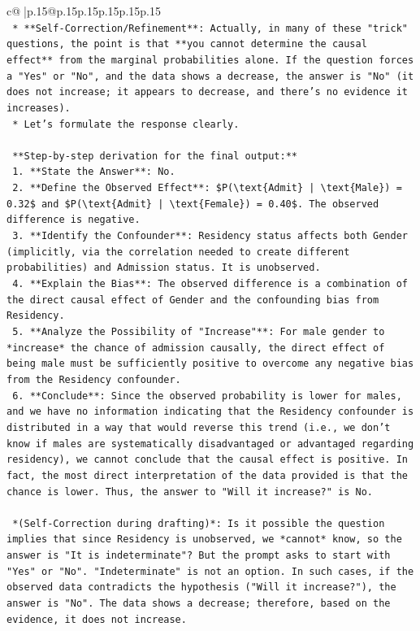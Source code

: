 \documentclass{article}
\begin{document}
{\begin{supertabular}{c@{$\;$}|p{.15\linewidth}@{}p{.15\linewidth}p{.15\linewidth}p{.15\linewidth}p{.15\linewidth}p{.15\linewidth}}
{{{\\ 
\texttt{    *   **Self{-}Correction/Refinement**: Actually, in many of these "trick" questions, the point is that **you cannot determine the causal effect** from the marginal probabilities alone. If the question forces a "Yes" or "No", and the data shows a decrease, the answer is "No" (it does not increase; it appears to decrease, and there's no evidence it increases).} \\
\texttt{    *   Let's formulate the response clearly.} \\
\\ 
\texttt{    **Step{-}by{-}step derivation for the final output:**} \\
\texttt{    1.  **State the Answer**: No.} \\
\texttt{    2.  **Define the Observed Effect**: \$P(\textbackslash{}text\{Admit\} | \textbackslash{}text\{Male\}) = 0.32\$ and \$P(\textbackslash{}text\{Admit\} | \textbackslash{}text\{Female\}) = 0.40\$. The observed difference is negative.} \\
\texttt{    3.  **Identify the Confounder**: Residency status affects both Gender (implicitly, via the correlation needed to create different probabilities) and Admission status. It is unobserved.} \\
\texttt{    4.  **Explain the Bias**: The observed difference is a combination of the direct causal effect of Gender and the confounding bias from Residency.} \\
\texttt{    5.  **Analyze the Possibility of "Increase"**: For male gender to *increase* the chance of admission causally, the direct effect of being male must be sufficiently positive to overcome any negative bias from the Residency confounder.} \\
\texttt{    6.  **Conclude**: Since the observed probability is lower for males, and we have no information indicating that the Residency confounder is distributed in a way that would reverse this trend (i.e., we don't know if males are systematically disadvantaged or advantaged regarding residency), we cannot conclude that the causal effect is positive. In fact, the most direct interpretation of the data provided is that the chance is lower. Thus, the answer to "Will it increase?" is No.} \\
\\ 
\texttt{    *(Self{-}Correction during drafting)*: Is it possible the question implies that since Residency is unobserved, we *cannot* know, so the answer is "It is indeterminate"? But the prompt asks to start with "Yes" or "No". "Indeterminate" is not an option. In such cases, if the observed data contradicts the hypothesis ("Will it increase?"), the answer is "No". The data shows a decrease; therefore, based on the evidence, it does not increase.} \\
}}}
\end{supertabular}}
\end{document}
